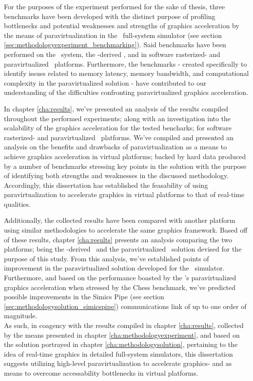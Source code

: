 For the purposes of the experiment performed for the sake of thesis, three benchmarks have been developed with the distinct purpose of profiling bottlenecks and potential weaknesses and strengths of graphics acceleration by the means of paravirtualization in the \dvttermsimics\ full-system simulator (see section \ref{sec:methodologyexperiment_benchmarking}).
Said benchmarks have been performed on the \dvttermhost\ system, the \dvttermqemu -derived \dvttermandroidemulator , and in software rasterized- and paravirtualized \dvttermsimics\ platforms.
Furthermore, the benchmarks - created specifically to identify issues related to memory latency, memory bandwidth, and computational complexity in the paravirtualized solution - have contributed to our understanding of the difficulties confronting paravirtualized graphics acceleration.

In chapter \ref{cha:results}, we've presented an analysis of the results compiled throughout the performed experiments; along with an investigation into the scalability of the graphics acceleration for the tested bencharks; for software rasterized- and paravirtualized \dvttermsimics\ platforms.
We've compiled and presented an analysis on the benefits and drawbacks of paravirtualization as a means to achieve graphics acceleration in virtual platforms; backed by hard data produced by a number of benchmarks stressing key points in the solution with the purpose of identifying both strengths and weaknesses in the discussed methodology.
Accordingly, this dissertation has established the feasability of using paravirtualization to accelerate graphics in virtual platforms to that of real-time qualities.

Additionally, the collected results have been compared with another platform using similar methodologies to accelerate the same graphics framework.
Based off of these results, chapter \ref{cha:results} presents an analysis comparing the two platforms; being the \dvttermqemu -derived \dvttermandroidemulator\ and the paravirtualized \dvttermsimics\ solution devised for the purpose of this study.
From this analysis, we've established points of improvement in the paravirtualized solution developed for the \dvttermsimics\ simulator.
Furthermore, and based on the performance boasted by the \dvttermandroidemulator 's paravirtualized graphics acceleration when stressed by the Chess benchmark, we've predicted possible improvements in the Simics Pipe (see section \ref{sec:methodologysolution_simicspipe}) communications link of up to one order of magnitude.\\

\noindent
As such, in coagency with the results compiled in chapter \ref{cha:results}, collected by the means presented in chapter \ref{cha:methodologyexperiment}, and based on the solution portrayed in chapter \ref{cha:methodologysolution}, pertaining to the idea of real-time graphics in detailed full-system simulators, this dissertation suggests utilizing high-level paravirtualization to accelerate graphics- and as means to overcome accessability bottlenecks in virtual platforms.
